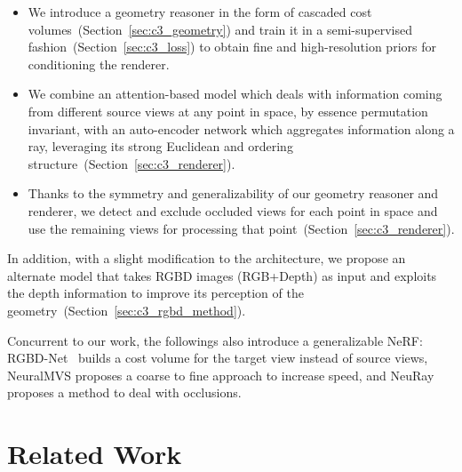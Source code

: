 \begin{itemize}
\item We introduce a geometry reasoner in the form of cascaded cost volumes~(Section~\ref{sec:c3_geometry}) and train it in a semi-supervised fashion~(Section~\ref{sec:c3_loss}) to obtain fine and high-resolution priors for conditioning the renderer.

\item We combine an attention-based model which deals with information coming from different source views at any point in space, by essence permutation invariant, with an auto-encoder network which aggregates information along a ray, leveraging its strong Euclidean and ordering structure~(Section~\ref{sec:c3_renderer}).

\item Thanks to the symmetry and generalizability of our geometry reasoner and renderer, we detect and exclude occluded views for each point in space and use the remaining views for processing that point~(Section~\ref{sec:c3_renderer}). 

\end{itemize}

In addition, with a slight modification to the architecture, we propose an alternate model that takes RGBD images (RGB+Depth) as input and exploits the depth information to improve its perception of the geometry~(Section~\ref{sec:c3_rgbd_method}).

Concurrent to our work, the followings also introduce a generalizable NeRF: RGBD-Net~\cite{nguyen2021rgbd} builds a cost volume for the target view instead of source views, NeuralMVS\cite{rosu2021neuralmvs} proposes a coarse to fine approach to increase speed, and NeuRay~\cite{liu2021neural} proposes a method to deal with occlusions.

\section{Related Work} \label{sec:c3_related}

